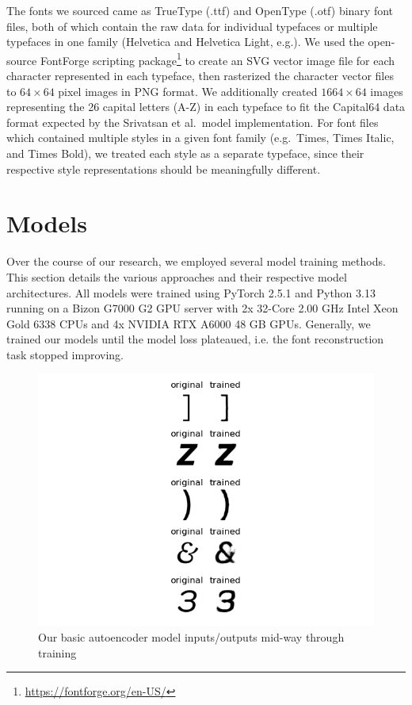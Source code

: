 The fonts we sourced came as TrueType (.ttf) and OpenType (.otf) binary font files, both of which contain the raw data for individual typefaces or multiple typefaces in one family (Helvetica and Helvetica Light, e.g.). We used the open-source FontForge scripting package\footnote{\url{https://fontforge.org/en-US/}} to create an SVG vector image file for each character represented in each typeface, then rasterized the character vector files to $64 \times 64$ pixel images in PNG format. We additionally created $1664 \times 64$ images representing the 26 capital letters (A-Z) in each typeface to fit the Capital64 data format expected by the Srivatsan et al.\ model implementation. For font files which contained multiple styles in a given font family (e.g.\ Times, Times Italic, and Times Bold), we treated each style as a separate typeface, since their respective style representations should be meaningfully different.

\section{Models}

Over the course of our research, we employed several model training methods. This section details the various approaches and their respective model architectures. All models were trained using PyTorch 2.5.1 and Python 3.13 running on a Bizon G7000 G2 GPU server with 2x 32-Core 2.00 GHz Intel Xeon Gold 6338 CPUs and 4x NVIDIA RTX A6000 48 GB GPUs. Generally, we trained our models until the model loss plateaued, i.e. the font reconstruction task stopped improving.

\begin{figure}[]
    \centering
    \includegraphics[width=\textwidth]{images/autoencoder-example.png}
    \caption{Our basic autoencoder model inputs/outputs mid-way through training}
    \label{fig:autoencoder-example}
\end{figure}

